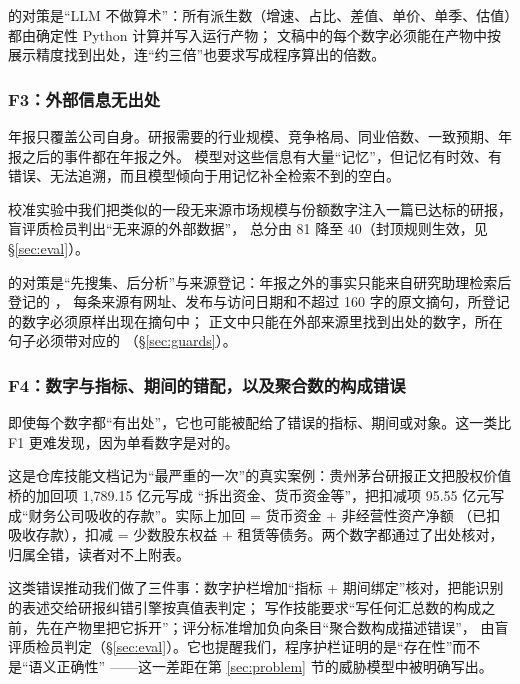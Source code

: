 \sysname{} 的对策是“LLM 不做算术”：所有派生数（增速、占比、差值、单价、单季、估值）都由确定性 Python 计算并写入运行产物；
文稿中的每个数字必须能在产物中按展示精度找到出处，连“约三倍”也要求写成程序算出的倍数。

\subsubsection{F3：外部信息无出处}
年报只覆盖公司自身。研报需要的行业规模、竞争格局、同业倍数、一致预期、年报之后的事件都在年报之外。
模型对这些信息有大量“记忆”，但记忆有时效、有错误、无法追溯，而且模型倾向于用记忆补全检索不到的空白。

\begin{failcase}[：凭记忆写行业数据]
校准实验中我们把类似的一段无来源市场规模与份额数字注入一篇已达标的研报，盲评质检员判出“无来源的外部数据”，
总分由 81 降至 40（封顶规则生效，见 \S\ref{sec:eval}）。
\end{failcase}

\sysname{} 的对策是“先搜集、后分析”与来源登记：年报之外的事实只能来自研究助理检索后登记的 ，
每条来源有网址、发布与访问日期和不超过 160 字的原文摘句，所登记的数字必须原样出现在摘句中；
正文中只能在外部来源里找到出处的数字，所在句子必须带对应的 \code{[S编号]}（\S\ref{sec:guards}）。

\subsubsection{F4：数字与指标、期间的错配，以及聚合数的构成错误}
即使每个数字都“有出处”，它也可能被配给了错误的指标、期间或对象。这一类比 F1 更难发现，因为单看数字是对的。

\begin{failcase}[：股权价值桥的构成写错]
这是仓库技能文档记为“最严重的一次”的真实案例：贵州茅台研报正文把股权价值桥的加回项 1,789.15 亿元写成
“拆出资金、货币资金等”，把扣减项 95.55 亿元写成“财务公司吸收的存款”。实际上加回 = 货币资金 + 非经营性资产净额
（已扣吸收存款），扣减 = 少数股东权益 + 租赁等债务。两个数字都通过了出处核对，归属全错，读者对不上附表。
\end{failcase}

这类错误推动我们做了三件事：数字护栏增加“指标 + 期间绑定”核对，把能识别的表述交给研报纠错引擎按真值表判定；
写作技能要求“写任何汇总数的构成之前，先在产物里把它拆开”；评分标准增加负向条目“聚合数构成描述错误”，
由盲评质检员判定（\S\ref{sec:eval}）。它也提醒我们，程序护栏证明的是“存在性”而不是“语义正确性”
——这一差距在第 \ref{sec:problem} 节的威胁模型中被明确写出。

